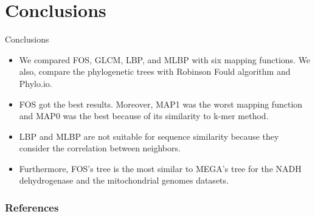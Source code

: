 \documentclass[10pt]{beamer}
\newcommand{\1}{
	\setbeamertemplate{background}{
		\texttt{[image: img/1]}
		\tikz[overlay] \fill[fill opacity=0.75,fill=white] (0,0) rectangle (-\paperwidth,\paperheight);
	}
}
\begin{document}
\section{Conclusions}
\begin{frame}{Conclusions}{}
	\begin{itemize}
		\item We compared FOS, GLCM, LBP, and MLBP with six mapping functions. We also, compare the phylogenetic trees with Robinson Fould algorithm and Phylo.io. \pause
		\item FOS got the best results. Moreover, MAP1 was the worst mapping function and MAP0 was the best because of its similarity to k-mer method. \pause
		\item LBP and MLBP are not suitable for sequence similarity because they consider the correlation between neighbors. \pause
		\item Furthermore, FOS's tree is the most similar to MEGA's tree for the NADH dehydrogenase and the mitochondrial genomes datasets.
	\end{itemize}
\end{frame}






\begin{frame}[allowframebreaks]
\frametitle{References}
%


\end{frame}
\end{document}
